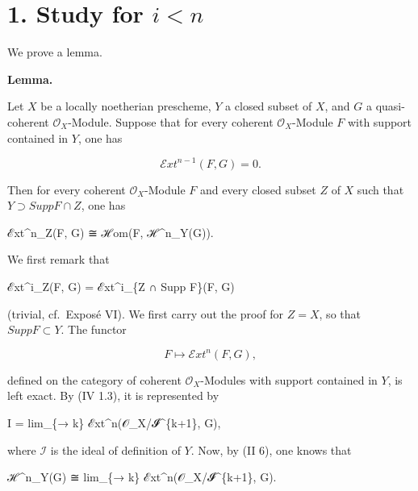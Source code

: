 \documentclass[
  11pt,
  a4paper,
]{book}
\newenvironment{Shaded}{}{}
\newcommand{\NormalTok}[1]{#1}
\begin{document}
\section{\texorpdfstring{1. Study for
\(i < n\)}{1. Study for i \textless{} n}}\label{study-for-i-n}

We prove a lemma.

\textbf{Lemma.}

Let \(X\) be a locally noetherian prescheme, \(Y\) a closed subset of
\(X\), and \(G\) a quasi-coherent \(\mathcal{O}_{X}\)-Module. Suppose
that for every coherent \(\mathcal{O}_{X}\)-Module \(F\) with support
contained in \(Y\), one has

\[ \mathcal{E}xt^{n-1}(F, G) = 0. \]

Then for every coherent \(\mathcal{O}_{X}\)-Module \(F\) and every
closed subset \(Z\) of \(X\) such that \(Y \supset Supp F \cap
Z\), one has

\begin{Shaded}
\begin{Highlighting}[]
\NormalTok{ℰxt\^{}n\_Z(F, G) ≅ ℋom(F, ℋ\^{}n\_Y(G)).}
\end{Highlighting}
\end{Shaded}

We first remark that

\begin{Shaded}
\begin{Highlighting}[]
\NormalTok{ℰxt\^{}i\_Z(F, G) = ℰxt\^{}i\_\{Z ∩ Supp F\}(F, G)}
\end{Highlighting}
\end{Shaded}

(trivial, cf.~Exposé VI). We first carry out the proof for \(Z = X\), so
that \(Supp F \subset Y\). The functor

\[ F \mapsto \mathcal{E}xt^{n}(F, G), \]

defined on the category of coherent \(\mathcal{O}_{X}\)-Modules with
support contained in \(Y\), is left exact. By (IV 1.3), it is
represented by

\begin{Shaded}
\begin{Highlighting}[]
\NormalTok{I = lim\_\{→ k\} ℰxt\^{}n(𝒪\_X/𝓘\^{}\{k+1\}, G),}
\end{Highlighting}
\end{Shaded}

where \(\mathcal{I}\) is the ideal of definition of \(Y\). Now, by (II
6), one knows that

\begin{Shaded}
\begin{Highlighting}[]
\NormalTok{ℋ\^{}n\_Y(G) ≅ lim\_\{→ k\} ℰxt\^{}n(𝒪\_X/𝓘\^{}\{k+1\}, G).}
\end{Highlighting}
\end{Shaded}
\end{document}
